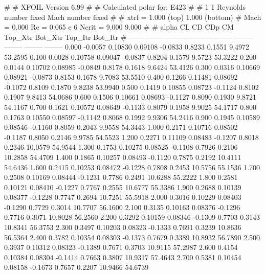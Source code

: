 #  
#       XFOIL         Version 6.99
#  
# Calculated polar for: E423                                            
#  
# 1 1 Reynolds number fixed          Mach number fixed         
#  
# xtrf =   1.000 (top)        1.000 (bottom)  
# Mach =   0.000     Re =     0.065 e 6     Ncrit =   9.000  9.000
#  
#   alpha    CL        CD       CDp       CM     Top_Xtr  Bot_Xtr  Top_Itr  Bot_Itr
#  ------ -------- --------- --------- -------- -------- -------- -------- --------
   0.000  -0.0057   0.10830   0.09108  -0.0833   0.8233   0.1551   9.4972  53.2595
   0.100   0.0028   0.10758   0.09047  -0.0837   0.8204   0.1579   9.5723  53.3222
   0.200   0.0144   0.10702   0.08985  -0.0849   0.8178   0.1618   9.6424  53.4126
   0.300   0.0316   0.10669   0.08921  -0.0873   0.8153   0.1678   9.7083  53.5510
   0.400   0.1266   0.11481   0.08692  -0.1072   0.8109   0.1870   9.8238  53.9940
   0.500   0.1419   0.10855   0.08723  -0.1124   0.8102   0.1907   9.8413  54.0686
   0.600   0.1506   0.10661   0.08693  -0.1127   0.8090   0.1930   9.8721  54.1167
   0.700   0.1621   0.10572   0.08649  -0.1133   0.8079   0.1958   9.9025  54.1717
   0.800   0.1763   0.10550   0.08597  -0.1142   0.8068   0.1992   9.9306  54.2416
   0.900   0.1945   0.10589   0.08546  -0.1160   0.8059   0.2043   9.9558  54.3443
   1.000   0.2171   0.10716   0.08502  -0.1187   0.8050   0.2146   9.9785  54.5523
   1.200   0.2271   0.11109   0.08483  -0.1207   0.8018   0.2346  10.0579  54.9544
   1.300   0.1753   0.10275   0.08525  -0.1108   0.7926   0.2106  10.2858  54.4709
   1.400   0.1865   0.10257   0.08493  -0.1120   0.7875   0.2192  10.4111  54.6436
   1.600   0.2415   0.10253   0.08472  -0.1228   0.7808   0.2453  10.5756  55.1536
   1.700   0.2508   0.10169   0.08444  -0.1231   0.7786   0.2491  10.6288  55.2222
   1.800   0.2581   0.10121   0.08410  -0.1227   0.7767   0.2555  10.6777  55.3386
   1.900   0.2688   0.10139   0.08377  -0.1228   0.7747   0.2694  10.7251  55.5918
   2.000   0.3016   0.10229   0.08403  -0.1290   0.7729   0.3014  10.7707  56.1600
   2.100   0.3135   0.10163   0.08376  -0.1296   0.7716   0.3071  10.8028  56.2560
   2.200   0.3292   0.10159   0.08346  -0.1309   0.7703   0.3143  10.8341  56.3753
   2.300   0.3497   0.10203   0.08323  -0.1333   0.7691   0.3239  10.8636  56.5364
   2.400   0.3782   0.10354   0.08303  -0.1373   0.7679   0.3389  10.8932  56.7890
   2.500   0.3937   0.10312   0.08323  -0.1389   0.7671   0.3703  10.9115  57.2987
   2.600   0.4154   0.10384   0.08304  -0.1414   0.7663   0.3807  10.9317  57.4643
   2.700   0.5381   0.10454   0.08158  -0.1673   0.7657   0.2207  10.9466  54.6739
